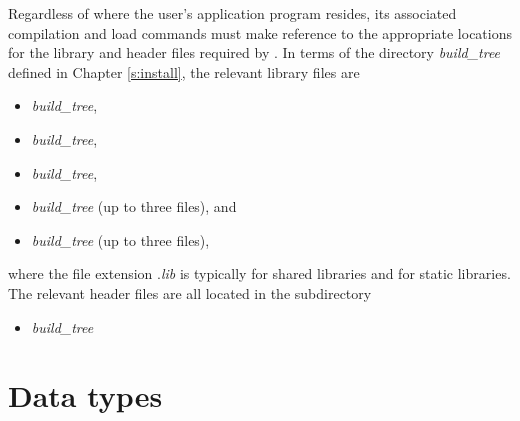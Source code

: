 Regardless of where the user's application program resides, its
associated compilation and load commands must make reference to the
appropriate locations for the library and header files required by
{\ida}.  In terms of the directory {\em build\_tree} defined in
Chapter \ref{s:install}, the relevant library files are
\begin{itemize}
\item {\em build\_tree},
\item {\em build\_tree},
\item {\em build\_tree},
\item {\em build\_tree} (up to three files), and
\item {\em build\_tree} (up to three files),
\end{itemize}
where the file extension .{\em lib} is typically  for shared libraries
and  for static libraries. The relevant header files are all located in
the subdirectory
\begin{itemize}
\item {\em build\_tree}
\end{itemize}


\section{Data types}\label{s:types}



